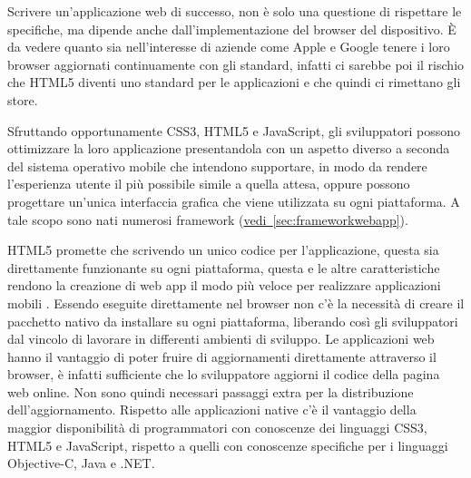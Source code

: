         Scrivere un'applicazione web di successo, non è solo una questione di
        rispettare le specifiche, ma dipende anche dall'implementazione del
        browser del dispositivo. È da vedere quanto sia nell'interesse di
        aziende come Apple e Google tenere i loro browser aggiornati
        continuamente con gli standard, infatti ci sarebbe poi il rischio che
        HTML5 diventi uno standard per le applicazioni e che quindi ci rimettano
        gli store\citep{White:Native-vs-Html}.

        Sfruttando opportunamente CSS3, HTML5 e JavaScript, gli sviluppatori
        possono ottimizzare la loro applicazione presentandola con un aspetto
        diverso a seconda del sistema operativo mobile che intendono supportare,
        in modo da rendere l'esperienza utente il più possibile simile a quella
        attesa, oppure possono progettare un'unica interfaccia grafica che viene
        utilizzata su ogni piattaforma. A tale scopo sono nati numerosi
        framework (\hyperref[sec:frameworkwebapp]{vedi~\ref{sec:frameworkwebapp}}).

        HTML5 promette che scrivendo un unico codice per l'applicazione,
        questa sia direttamente funzionante su ogni piattaforma, questa e le
        altre caratteristiche rendono la creazione di web app il modo più veloce
        per realizzare applicazioni mobili  \crossplat{}. Essendo eseguite
        direttamente nel browser non c'è la necessità di creare il pacchetto
        nativo da installare su ogni piattaforma, liberando così gli
        sviluppatori dal vincolo di lavorare in differenti ambienti di sviluppo.
        Le applicazioni web hanno il vantaggio di poter fruire di aggiornamenti
        direttamente attraverso il browser, è infatti sufficiente che lo
        sviluppatore aggiorni il codice della pagina web online. Non sono quindi
        necessari passaggi extra per la distribuzione dell'aggiornamento.
        Rispetto alle applicazioni native c'è il vantaggio della maggior
        disponibilità di programmatori con conoscenze dei linguaggi CSS3, HTML5
        e JavaScript, rispetto a quelli con conoscenze specifiche per i
        linguaggi Objective-C, Java e .NET.


